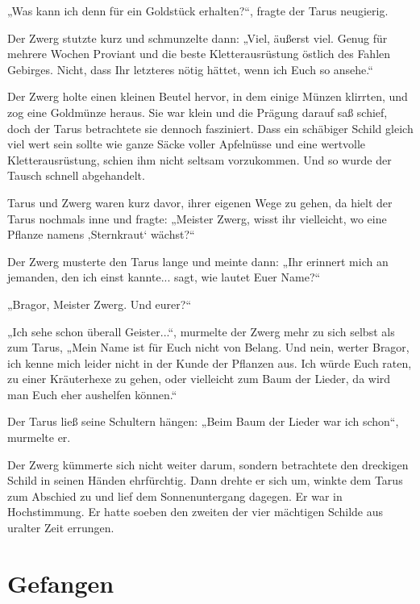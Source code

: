 „Was kann ich denn für ein Goldstück erhalten?“, fragte der Tarus neugierig.

Der Zwerg stutzte kurz und schmunzelte dann: „Viel, äußerst viel. Genug für mehrere Wochen Proviant und die beste Kletterausrüstung östlich des Fahlen Gebirges. Nicht, dass Ihr letzteres nötig hättet, wenn ich Euch so ansehe.“

Der Zwerg holte einen kleinen Beutel hervor, in dem einige Münzen klirrten, und zog eine Goldmünze heraus. Sie war klein und die Prägung darauf saß schief, doch der Tarus betrachtete sie dennoch fasziniert. Dass ein schäbiger Schild gleich viel wert sein sollte wie ganze Säcke voller Apfelnüsse und eine wertvolle Kletterausrüstung, schien ihm nicht seltsam vorzukommen. Und so wurde der Tausch schnell abgehandelt.

Tarus und Zwerg waren kurz davor, ihrer eigenen Wege zu gehen, da hielt der Tarus nochmals inne und fragte: „Meister Zwerg, wisst ihr vielleicht, wo eine Pflanze namens ‚Sternkraut‘ wächst?“

Der Zwerg musterte den Tarus lange und meinte dann: „Ihr erinnert mich an jemanden, den ich einst kannte... sagt, wie lautet Euer Name?“

„Bragor, Meister Zwerg. Und eurer?“

„Ich sehe schon überall Geister...“, murmelte der Zwerg mehr zu sich selbst als zum Tarus, „Mein Name ist für Euch nicht von Belang. Und nein, werter Bragor, ich kenne mich leider nicht in der Kunde der Pflanzen aus. Ich würde Euch raten, zu einer Kräuterhexe zu gehen, oder vielleicht zum Baum der Lieder, da wird man Euch eher aushelfen können.“

Der Tarus ließ seine Schultern hängen: „Beim Baum der Lieder war ich schon“, murmelte er.

Der Zwerg kümmerte sich nicht weiter darum, sondern betrachtete den dreckigen Schild in seinen Händen ehrfürchtig. Dann drehte er sich um, winkte dem Tarus zum Abschied zu und lief dem Sonnenuntergang dagegen. Er war in Hochstimmung. Er hatte soeben den zweiten der vier mächtigen Schilde aus uralter Zeit errungen.








\newpage
\section{Gefangen}




